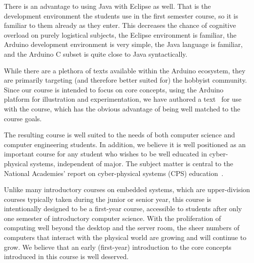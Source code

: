 There is an advantage to using Java with Eclipse as well. That is the
development environment the students use in the first semester course, so
it is familiar to them already as they enter.  This decreases the chance
of cognitive overload on purely logistical subjects, the Eclipse environment
is familiar, the Arduino development environment is very simple, the
Java language is familiar, and the Arduino C subset is quite close to
Java syntactically.

While there are a plethora of texts available within the Arduino
ecosystem, they are primarily targeting (and therefore better suited for)
the hobbyist community. Since
our course is intended to focus on core concepts, using the
Arduino platform for illustration and experimentation, we have authored
a text~\cite{cc17} for use with the course, which has the obvious
advantage of being well matched to the course goals.

The resulting course is well suited to the needs of
both computer science and computer engineering students.
In addition, we believe it is well positioned as an important course for
any student who wishes to be well educated in cyber-physical systems,
independent of major.
The subject matter is central to the National Academies' report on
cyber-physical systems (CPS) education~\cite{nasem16}.

Unlike many introductory courses on embedded systems, which are upper-division
courses typically taken during the junior or senior year, this course is
intentionally
designed to be a first-year course, accessible to students after only
one semester of introductory computer science.  With the proliferation of
computing well beyond the desktop and the server room, the sheer numbers
of computers that interact with the physical world are growing and
will continue to grow.
We believe that an early (first-year) introduction to the core concepts
introduced in this course is well deserved.

